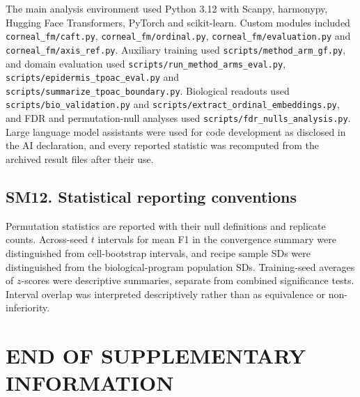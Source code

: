 \documentclass[12pt,a4paper]{article}
\begin{document}
The main analysis environment used Python 3.12 with Scanpy, harmonypy, Hugging Face Transformers, PyTorch and scikit-learn. Custom modules included \texttt{corneal\_fm/caft.py}, \texttt{corneal\_fm/ordinal.py}, \texttt{corneal\_fm/evaluation.py} and \texttt{corneal\_fm/axis\_ref.py}. Auxiliary training used \texttt{scripts/method\_arm\_gf.py}, and domain evaluation used \texttt{scripts/run\_method\_arms\_eval.py}, \texttt{scripts/epidermis\_tpoac\_eval.py} and \texttt{scripts/summarize\_tpoac\_boundary.py}. Biological readouts used \texttt{scripts/bio\_validation.py} and \texttt{scripts/extract\_ordinal\_embeddings.py}, and FDR and permutation-null analyses used \texttt{scripts/fdr\_nulls\_analysis.py}. Large language model assistants were used for code development as disclosed in the AI declaration, and every reported statistic was recomputed from the archived result files after their use.

\subsection*{SM12. Statistical reporting conventions}
Permutation statistics are reported with their null definitions and replicate counts. Across-seed $t$ intervals for mean F1 in the convergence summary were distinguished from cell-bootstrap intervals, and recipe sample SDs were distinguished from the biological-program population SDs. Training-seed averages of $z$-scores were descriptive summaries, separate from combined significance tests. Interval overlap was interpreted descriptively rather than as equivalence or non-inferiority.

\newpage
\section*{END OF SUPPLEMENTARY INFORMATION}
\end{document}
